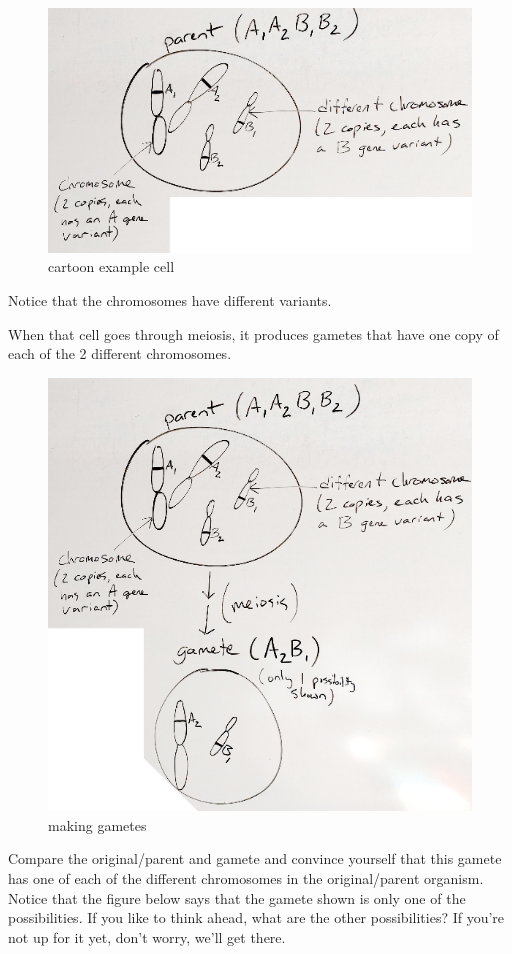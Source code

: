 \documentclass[]{book}
\theoremstyle{definition}
\theoremstyle{definition}
\theoremstyle{definition}
\theoremstyle{remark}
\begin{document}
\begin{figure}

{\centering \includegraphics[width=0.75\linewidth]{01-basics-figures/meiosis1} 

}

\caption{cartoon example cell}\label{fig:gen-fig-1}
\end{figure}

Notice that the chromosomes have different variants.

When that cell goes through meiosis, it produces gametes that have one
copy of each of the 2 different chromosomes.

\begin{figure}

{\centering \includegraphics[width=0.75\linewidth]{01-basics-figures/meiosis2} 

}

\caption{making gametes}\label{fig:gen-fig-2}
\end{figure}

Compare the original/parent and gamete and convince yourself that this
gamete has one of each of the different chromosomes in the
original/parent organism. Notice that the figure below says that the
gamete shown is only one of the possibilities. If you like to think
ahead, what are the other possibilities? If you're not up for it yet,
don't worry, we'll get there.
\end{document}

